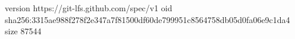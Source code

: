 version https://git-lfs.github.com/spec/v1
oid sha256:3315ae988f278f2e347a7f81500df60de799951c8564758db05d0fa06e9c1da4
size 87544
